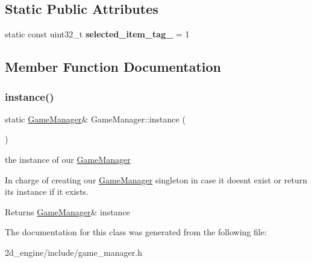 \subsection*{Static Public Attributes}
\begin{DoxyCompactItemize}
\item 
\mbox{\label{class_game_manager_adce064d683ccffc7d98dca0f7a2b7b91}} 
static const uint32\+\_\+t {\bfseries selected\+\_\+item\+\_\+tag\+\_\+} = 1
\end{DoxyCompactItemize}


\subsection{Member Function Documentation}
\mbox{\label{class_game_manager_afa37ab23c040b5225d567d4c9ab854e1}} 
\subsubsection{\texorpdfstring{instance()}{instance()}}
{\footnotesize\ttfamily static \hyperlink{class_game_manager}{Game\+Manager}\& Game\+Manager\+::instance (\begin{DoxyParamCaption}{ }\end{DoxyParamCaption})\hspace{0.3cm}{\ttfamily [static]}}

the instance of our \hyperlink{class_game_manager}{Game\+Manager}

In charge of creating our \hyperlink{class_game_manager}{Game\+Manager} singleton in case it doesn\textquotesingle{}t exist or return it\textquotesingle{}s instance if it exists.

\begin{DoxyReturn}{Returns}
\hyperlink{class_game_manager}{Game\+Manager}\& instance 
\end{DoxyReturn}


The documentation for this class was generated from the following file\+:\begin{DoxyCompactItemize}
\item 
2d\+\_\+engine/include/game\+\_\+manager.\+h\end{DoxyCompactItemize}
